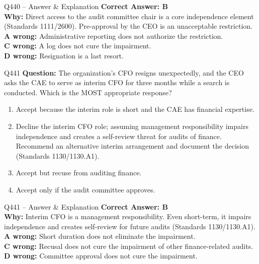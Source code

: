 \documentclass[aspectratio=169,10pt]{beamer}
\begin{document}
	\begin{frame}[t]{Q440 -- Answer \& Explanation}
		\small
		\textbf{Correct Answer: B} \\[4pt]
		\textbf{Why:} Direct access to the audit committee chair is a core independence element (Standards 1111/2600). Pre-approval by the CEO is an unacceptable restriction. \\[4pt]
		\textbf{A wrong:} Administrative reporting does not authorize the restriction. \\[2pt]
		\textbf{C wrong:} A log does not cure the impairment. \\[2pt]
		\textbf{D wrong:} Resignation is a last resort.
	\end{frame}
	
	\begin{frame}[t]{Q441}
		\small
		\textbf{Question:} The organization's CFO resigns unexpectedly, and the CEO asks the CAE to serve as interim CFO for three months while a search is conducted. Which is the MOST appropriate response?
		\begin{enumerate}[label=\Alph*.,itemsep=1pt,topsep=2pt]
			\item Accept because the interim role is short and the CAE has financial expertise.
			\item Decline the interim CFO role; assuming management responsibility impairs independence and creates a self-review threat for audits of finance. Recommend an alternative interim arrangement and document the decision (Standards 1130/1130.A1).
			\item Accept but recuse from auditing finance.
			\item Accept only if the audit committee approves.
		\end{enumerate}
	\end{frame}
	
	\begin{frame}[t]{Q441 -- Answer \& Explanation}
		\small
		\textbf{Correct Answer: B} \\[4pt]
		\textbf{Why:} Interim CFO is a management responsibility. Even short-term, it impairs independence and creates self-review for future audits (Standards 1130/1130.A1). \\[4pt]
		\textbf{A wrong:} Short duration does not eliminate the impairment. \\[2pt]
		\textbf{C wrong:} Recusal does not cure the impairment of other finance-related audits. \\[2pt]
		\textbf{D wrong:} Committee approval does not cure the impairment.
	\end{frame}
	
\end{document}
